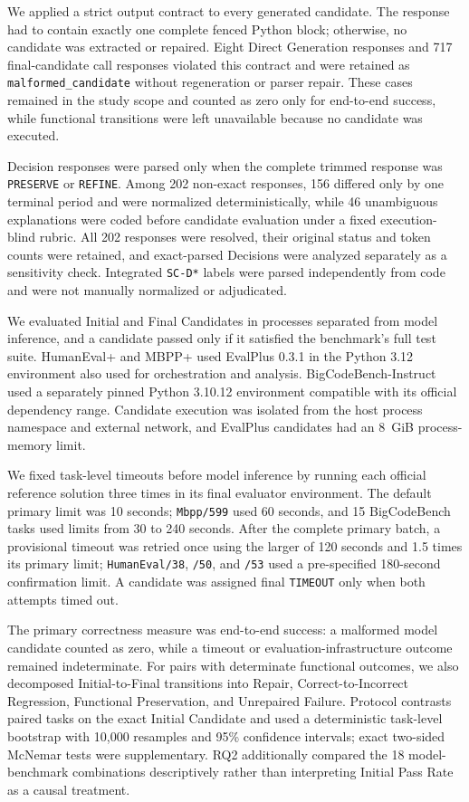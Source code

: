 We applied a strict output contract to every generated candidate.
The response had to contain exactly one complete fenced Python block; otherwise, no candidate was extracted or repaired.
Eight Direct Generation responses and 717 final-candidate call responses violated this contract and were retained as \texttt{malformed\_candidate} without regeneration or parser repair.
These cases remained in the study scope and counted as zero only for end-to-end success, while functional transitions were left unavailable because no candidate was executed.

Decision responses were parsed only when the complete trimmed response was \texttt{PRESERVE} or \texttt{REFINE}.
Among 202 non-exact responses, 156 differed only by one terminal period and were normalized deterministically, while 46 unambiguous explanations were coded before candidate evaluation under a fixed execution-blind rubric.
All 202 responses were resolved, their original status and token counts were retained, and exact-parsed Decisions were analyzed separately as a sensitivity check.
Integrated \texttt{SC-D*} labels were parsed independently from code and were not manually normalized or adjudicated.

We evaluated Initial and Final Candidates in processes separated from model inference, and a candidate passed only if it satisfied the benchmark's full test suite.
HumanEval+ and MBPP+ used EvalPlus 0.3.1 in the Python 3.12 environment also used for orchestration and analysis.
BigCodeBench-Instruct used a separately pinned Python 3.10.12 environment compatible with its official dependency range.
Candidate execution was isolated from the host process namespace and external network, and EvalPlus candidates had an 8~GiB process-memory limit.

We fixed task-level timeouts before model inference by running each official reference solution three times in its final evaluator environment.
The default primary limit was 10 seconds; \texttt{Mbpp/599} used 60 seconds, and 15 BigCodeBench tasks used limits from 30 to 240 seconds.
After the complete primary batch, a provisional timeout was retried once using the larger of 120 seconds and 1.5 times its primary limit; \texttt{HumanEval/38}, \texttt{/50}, and \texttt{/53} used a pre-specified 180-second confirmation limit.
A candidate was assigned final \texttt{TIMEOUT} only when both attempts timed out.

The primary correctness measure was end-to-end success: a malformed model candidate counted as zero, while a timeout or evaluation-infrastructure outcome remained indeterminate.
For pairs with determinate functional outcomes, we also decomposed Initial-to-Final transitions into Repair, Correct-to-Incorrect Regression, Functional Preservation, and Unrepaired Failure.
Protocol contrasts paired tasks on the exact Initial Candidate and used a deterministic task-level bootstrap with 10,000 resamples and 95\% confidence intervals; exact two-sided McNemar tests were supplementary.
RQ2 additionally compared the 18 model-benchmark combinations descriptively rather than interpreting Initial Pass Rate as a causal treatment.

